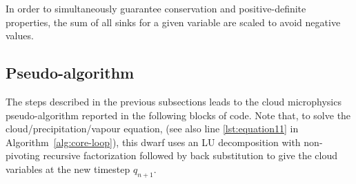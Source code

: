 \documentclass[
a4paper,     %
12pt,        %
article,
onecolumn,   %
openany,     %
]{memoir}
\begin{document}
In order to simultaneously guarantee conservation and positive-definite properties, the sum of all 
sinks for a given variable are scaled to avoid negative values. 


\newpage
\subsection{Pseudo-algorithm}
The steps described in the previous subsections leads to the cloud microphysics pseudo-algorithm 
reported in the following blocks of code. Note that, to solve the cloud/precipitation/vapour equation, 
(see also line \ref{lst:equation11} in Algorithm~\ref{alg:core-loop}), this dwarf uses an LU decomposition 
with non-pivoting recursive factorization followed by back substitution to give the cloud variables 
at the new timestep $q_{n+1}$.
\end{document}
